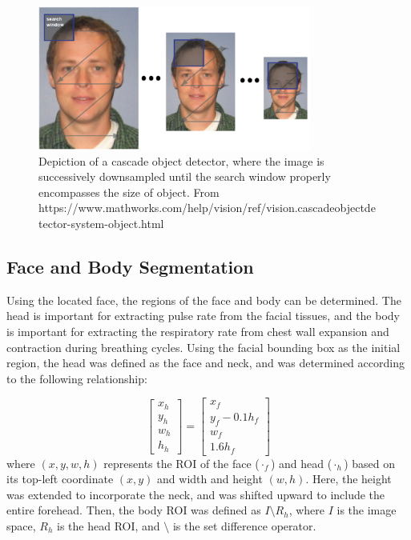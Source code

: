 \documentclass{article}
\begin{document}
\begin{figure}[H]
\centering
\includegraphics[width=0.8\textwidth]{Milestone2_Cascade}
\caption{Depiction of a cascade object detector, where the image is successively downsampled until the search window properly encompasses the size of object. From https://www.mathworks.com/help/vision/ref/vision.cascadeobjectdetector-system-object.html}
\label{fig:cascade}
\end{figure}


\subsection{Face and Body Segmentation}
Using the located face, the regions of the face and body can be determined. The head is important for extracting pulse rate from the facial tissues, and the body is important for extracting the respiratory rate from chest wall expansion and contraction during breathing cycles. Using the facial bounding box as the initial region, the head was defined as the face and neck, and was determined according to the following relationship:

\begin{equation}
\begin{bmatrix}
           x_h \\
           y_h \\
           w_h \\
           h_h
         \end{bmatrix} = 
\begin{bmatrix}
           x_f \\
           y_f-0.1h_f \\
           w_f \\
           1.6h_f
         \end{bmatrix}
\label{eq:bbox}
\end{equation}
where $(x,y,w,h)$ represents the ROI of the face ($\cdot _f$) and head ($\cdot _h$) based on its top-left coordinate $(x,y)$ and width and height $(w,h)$. Here, the height was extended to incorporate the neck, and was shifted upward to include the entire forehead. Then, the body ROI was defined as $I \setminus R_h$, where $I$ is the image space, $R_h$ is the head ROI, and $\setminus$ is the set difference operator.
\end{document}
